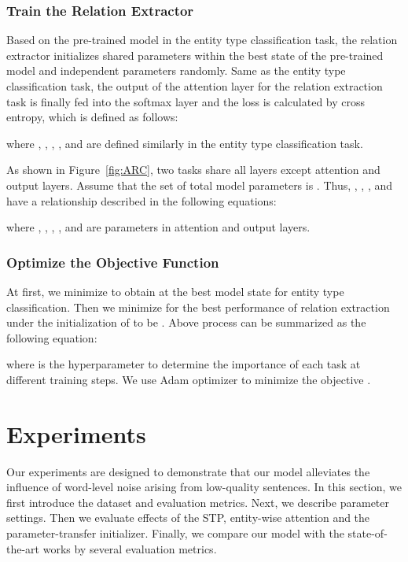 \documentclass[11pt,a4paper]{article}
\begin{document}
  \subsubsection*{Train the Relation Extractor}
  Based on the pre-trained model in the entity type classification task, the relation extractor initializes shared parameters  within the best state of the pre-trained model and independent parameters  randomly. Same as the entity type classification task, the output  of the attention layer for the relation extraction task is finally fed into the softmax layer and the loss is calculated by cross entropy, which is defined as follows:
  
  where , , , ,  and  are defined similarly in the entity type classification task.

  As shown in Figure~\ref{fig:ARC}, two tasks share all layers except attention and output layers. Assume that the set of total model parameters is . Thus, , , ,  and  have a relationship described in the following equations:
  
  where , , , ,  and  are parameters in attention and output layers.
  
  \subsubsection*{Optimize the Objective Function}
  At first, we minimize  to obtain  at the best model state  for entity type classification. Then we minimize  for the best performance of relation extraction under the initialization of  to be . Above process can be summarized as the following equation:
  
  where  is the hyperparameter to determine the importance of each task at different training steps. We use Adam \citep{kingma2014adam} optimizer to minimize the objective .

\section{Experiments}
  Our experiments are designed to demonstrate that our model alleviates the influence of word-level noise arising from low-quality sentences. In this section, we first introduce the dataset and evaluation metrics. Next, we describe parameter settings. Then we evaluate effects of the STP, entity-wise attention and the parameter-transfer initializer. Finally, we compare our model with the state-of-the-art works by several evaluation metrics.
\end{document}
